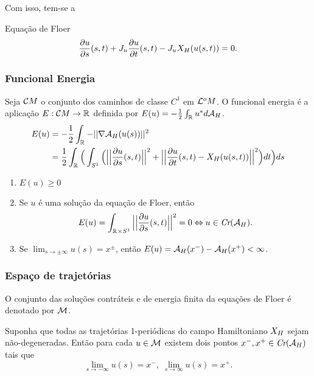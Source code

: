 \documentclass{beamer}
\begin{document}
\begin{footnotesize}
\begin{frame}
		Com isso, tem-se a
		\begin{block}{Equação de Floer}
			$$
			\frac{\partial u}{\partial s}(s,t) + J_{u}\frac{\partial u}{\partial t}(s,t) - J_{u}X_{H}(u(s,t))=0.
			$$
		\end{block}
	\end{frame}
	
	\begin{frame}
		\frametitle{Funcional Energia}
		
		Seja $\mathcal{C}M$ o conjunto dos caminhos de classe $C^{1}$ em $\mathcal{L}^{o}M$. O funcional energia é a aplicação $E: \mathcal{C}M \to \mathbb{R}^{}$ definida por $E(u)
		=-\frac{1}{2}\int_{\mathbb{R}^{}}u^{*}d\mathcal{A}_{H}$.
		$$
		\begin{aligned}
			E(u) &= -\frac{1}{2}\int_{\mathbb{R}^{}}-||\nabla \mathcal{A}_{H}(u(s))||^{2}
			\\
			&= \frac{1}{2}\int_{\mathbb{R}^{}}\Big(  \int_{S^{1}} \Big( \Big|\Big|\frac{\partial u}{\partial s}(s,t)\Big|\Big|^{2} + \Big|\Big|\frac{\partial u}{\partial t}(s,t) - X_{H}(u(s,t))\Big|\Big|^{2} \Big) dt  \Big)ds
		\end{aligned}
		$$
		
		\begin{enumerate}
			\item $E(u)\geq0$
			
			\item Se $u$ é uma solução da equação de Floer, então
			$$
			E(u)=\int_{\mathbb{R}^{} \times S^{1}}\Big|\Big|\frac{\partial u}{\partial s}(s,t)\Big|\Big|^{2} =0 \Leftrightarrow u \in \textit{Cr}(\mathcal{A}_{H}).
			$$
			
			\item Se $\lim_{s\to \pm\infty}u(s)=x^{\pm}$, então $E(u)=\mathcal{A}_{H}(x^{-}) - \mathcal{A}_{H}(x^{+})<\infty$.
		\end{enumerate}
	\end{frame}

	\begin{frame}
		\frametitle{Espaço de trajetórias}
		O conjunto das soluções contráteis e de energia finita da equações de Floer é denotado por $\mathcal{M}$.
		
		\begin{teorema}\label{teorema_limite_solucoes_energia_finita}
			Suponha que todas as trajetórias 1-periódicas do campo Hamiltoniano $X_{H}$ sejam não-degeneradas. Então para cada $u \in \mathcal{M}$ existem dois pontos $x^{-}, x^{+}\in \textit{Cr}(\mathcal{A}_{H})$ tais que
			$$
			\lim_{s\to -\infty}u(s)=x^{-},\; \lim_{s\to \infty}u(s)=x^{+}.
			$$
		\end{teorema}
		

\end{frame}
\end{footnotesize}
\end{document}
